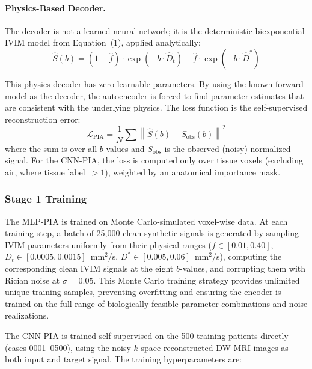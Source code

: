 \documentclass[12pt]{article}
\begin{document}
\paragraph{Physics-Based Decoder.}
The decoder is not a learned neural network; it is the deterministic biexponential IVIM model from Equation~(1), applied analytically:
\begin{equation}
\hat{S}(b) = (1 - \hat{f}) \cdot \exp(-b \cdot \hat{D}_t) + \hat{f} \cdot \exp(-b \cdot \hat{D}^*)
\label{eq:decoder}
\end{equation}

This physics decoder has zero learnable parameters. By using the known forward model as the decoder, the autoencoder is forced to find parameter estimates that are consistent with the underlying physics. The loss function is the self-supervised reconstruction error:
\begin{equation}
\mathcal{L}_{\text{PIA}} = \frac{1}{N} \sum \left\|\hat{S}(b) - S_{\text{obs}}(b)\right\|^2
\label{eq:loss_pia}
\end{equation}
where the sum is over all $b$-values and $S_{\text{obs}}$ is the observed (noisy) normalized signal. For the CNN-PIA, the loss is computed only over tissue voxels (excluding air, where tissue label~$>1$), weighted by an anatomical importance mask.

\subsubsection{Stage 1 Training}

The MLP-PIA is trained on Monte Carlo-simulated voxel-wise data. At each training step, a batch of 25,000 clean synthetic signals is generated by sampling IVIM parameters uniformly from their physical ranges ($f \in [0.01, 0.40]$, $D_t \in [0.0005, 0.0015]$~mm$^2$/s, $D^* \in [0.005, 0.06]$~mm$^2$/s), computing the corresponding clean IVIM signals at the eight $b$-values, and corrupting them with Rician noise at $\sigma = 0.05$. This Monte Carlo training strategy provides unlimited unique training samples, preventing overfitting and ensuring the encoder is trained on the full range of biologically feasible parameter combinations and noise realizations.

The CNN-PIA is trained self-supervised on the 500 training patients directly (cases 0001--0500), using the noisy $k$-space-reconstructed DW-MRI images as both input and target signal. The training hyperparameters are:
\end{document}
